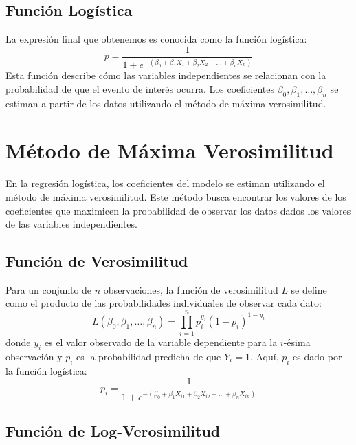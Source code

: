 \subsection*{Función Logística}

La expresión final que obtenemos es conocida como la función logística:
\begin{equation}
p = \frac{1}{1 + e^{-\left(\beta_0 + \beta_1 X_1 + \beta_2 X_2 + \ldots + \beta_n X_n\right)}}
\end{equation}
Esta función describe cómo las variables independientes se relacionan con la probabilidad de que el evento de interés ocurra. Los coeficientes $\beta_0, \beta_1, \ldots, \beta_n$ se estiman a partir de los datos utilizando el método de máxima verosimilitud.

\section{Método de Máxima Verosimilitud}

En la regresión logística, los coeficientes del modelo se estiman utilizando el método de máxima verosimilitud. Este método busca encontrar los valores de los coeficientes que maximicen la probabilidad de observar los datos dados los valores de las variables independientes.

\subsection*{Función de Verosimilitud}

Para un conjunto de $n$ observaciones, la función de verosimilitud $L$ se define como el producto de las probabilidades individuales de observar cada dato:
\begin{equation}
L(\beta_0, \beta_1, \ldots, \beta_n) = \prod_{i=1}^{n} p_i^{y_i} (1 - p_i)^{1 - y_i}
\end{equation}
donde $y_i$ es el valor observado de la variable dependiente para la $i$-ésima observación y $p_i$ es la probabilidad predicha de que $Y_i = 1$. Aquí, $p_i$ es dado por la función logística:
\begin{equation}
p_i = \frac{1}{1 + e^{-(\beta_0 + \beta_1 X_{i1} + \beta_2 X_{i2} + \ldots + \beta_n X_{in})}}
\end{equation}

\subsection*{Función de Log-Verosimilitud}

